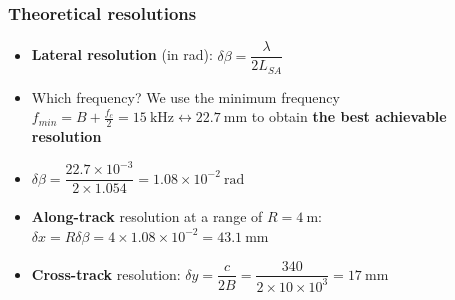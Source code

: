 \documentclass[UKenglish,8pt,aspectratio=1610]{beamer}
\begin{document}
\begin{frame}
\frametitle{Theoretical resolutions}
\begin{itemize}
\item \textbf{Lateral resolution} (in rad): $\delta\beta = \dfrac{\lambda}{2L_{SA}}$
\item Which frequency? We use the minimum frequency $f_{min}=B+\frac{f_c}{2}=15~\si{\kilo\hertz}\leftrightarrow 22.7~\si{\milli\meter}$ to obtain \textbf{the best achievable resolution}
\item $\delta\beta = \dfrac{22.7\times 10^{-3}}{2\times 1.054}=1.08\times 10^{-2}~\si{\radian}$
\item \textbf{Along-track} resolution at a range of $R=4~\si{\meter}$: $\delta x = R\delta\beta=4\times 1.08\times 10^{-2} = 43.1~\si{\milli\meter}$
\item \textbf{Cross-track} resolution: $\delta y=\dfrac{c}{2B}=\dfrac{340}{2\times 10\times 10^{3}}= 17~\si{\milli\meter}$
\end{itemize}
\end{frame}
\end{document}
